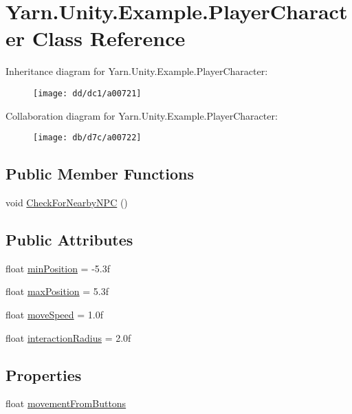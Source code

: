 \hypertarget{a00122}{\section{Yarn.\-Unity.\-Example.\-Player\-Character Class Reference}
\label{a00122}
}


Inheritance diagram for Yarn.\-Unity.\-Example.\-Player\-Character\-:
\nopagebreak
\begin{figure}[H]
\begin{center}
\leavevmode
\texttt{[image: dd/dc1/a00721]}
\end{center}
\end{figure}


Collaboration diagram for Yarn.\-Unity.\-Example.\-Player\-Character\-:
\nopagebreak
\begin{figure}[H]
\begin{center}
\leavevmode
\texttt{[image: db/d7c/a00722]}
\end{center}
\end{figure}
\subsection*{Public Member Functions}
\begin{DoxyCompactItemize}
\item 
void \hyperlink{a00122_a574b6d984b8671c7a780d3d10e040a9b}{Check\-For\-Nearby\-N\-P\-C} ()
\end{DoxyCompactItemize}
\subsection*{Public Attributes}
\begin{DoxyCompactItemize}
\item 
float \hyperlink{a00122_ac025d4f4afaf854f8256e0d2d03e5b52}{min\-Position} = -\/5.\-3f
\item 
float \hyperlink{a00122_ada9dd748a1d89a7f9b12ac8967a07ae6}{max\-Position} = 5.\-3f
\item 
float \hyperlink{a00122_adc602a4b2c7e44e4b15a11f1ffcf07e4}{move\-Speed} = 1.\-0f
\item 
float \hyperlink{a00122_af89807d2195915ee9a0c42317e110fc6}{interaction\-Radius} = 2.\-0f
\end{DoxyCompactItemize}
\subsection*{Properties}
\begin{DoxyCompactItemize}
\item 
float \hyperlink{a00122_a7bcde19f080bfd09bbc833b8fb555cf7}{movement\-From\-Buttons}
\end{DoxyCompactItemize}
